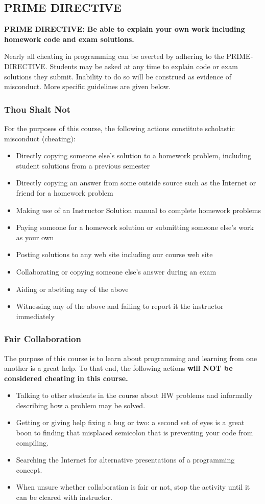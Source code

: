 \documentclass[11pt]{article}
\begin{document}
\subsection{PRIME DIRECTIVE}
\label{sec-5-1}
\textbf{\label{PRIME-DIRECTIVE}PRIME DIRECTIVE: Be able to explain your own work including homework code and exam solutions.}

Nearly all cheating in programming can be averted by adhering to the
PRIME-DIRECTIVE. Students may be asked at any time to explain code
or exam solutions they submit.  Inability to do so will be construed
as evidence of misconduct.  More specific guidelines are given below.

\subsubsection{Thou Shalt Not}
\label{sec-5-2}
For the purposes of this course, the following actions constitute
scholastic misconduct (cheating):
\begin{itemize}
\item Directly copying someone else's solution to a homework problem,
including student solutions from a previous semester
\item Directly copying an answer from some outside source such as the
Internet or friend for a homework problem
\item Making use of an Instructor Solution manual to complete homework
problems
\item Paying someone for a homework solution or submitting someone else's
work as your own
\item Posting solutions to any web site including our course web site
\item Collaborating or copying someone else's answer during an exam
\item Aiding or abetting any of the above
\item Witnessing any of the above and failing to report it the instructor
immediately
\end{itemize}

\subsubsection{Fair Collaboration}
The purpose of this course is to learn about programming and learning
from one another is a great help.  To that end, the following actions
\textbf{will NOT be considered cheating in this course.}
\begin{itemize}
\item Talking to other students in the course about HW problems and
informally describing how a problem may be solved.
\item Getting or giving help fixing a bug or two: a second set
of eyes is a great boon to finding that misplaced semicolon that is
preventing your code from compiling.
\item Searching the Internet for alternative presentations of a
programming concept.
\item When unsure whether collaboration is fair or not, stop the activity
until it can be cleared with instructor.
\end{itemize}
\end{document}
